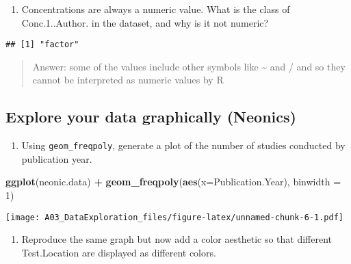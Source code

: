 \documentclass[
]{article}
\newenvironment{Shaded}{\begin{snugshade}}{\end{snugshade}}
\newcommand{\DataTypeTok}[1]{\textcolor[rgb]{0.13,0.29,0.53}{#1}}
\newcommand{\DecValTok}[1]{\textcolor[rgb]{0.00,0.00,0.81}{#1}}
\newcommand{\KeywordTok}[1]{\textcolor[rgb]{0.13,0.29,0.53}{\textbf{#1}}}
\newcommand{\NormalTok}[1]{#1}
\newcommand{\OperatorTok}[1]{\textcolor[rgb]{0.81,0.36,0.00}{\textbf{#1}}}
\newcommand{\StringTok}[1]{\textcolor[rgb]{0.31,0.60,0.02}{#1}}
\providecommand{\tightlist}{%
  \setlength{\itemsep}{0pt}\setlength{\parskip}{0pt}}
\begin{document}
\begin{enumerate}
\def\labelenumi{\arabic{enumi}.}
\setcounter{enumi}{7}
\tightlist
\item
  Concentrations are always a numeric value. What is the class of
  Conc.1..Author. in the dataset, and why is it not numeric?
\end{enumerate}

\begin{Shaded}
\end{Shaded}

\begin{verbatim}
## [1] "factor"
\end{verbatim}

\begin{quote}
Answer: some of the values include other symbols like \textasciitilde{}
and / and so they cannot be interpreted as numeric values by R
\end{quote}

\hypertarget{explore-your-data-graphically-neonics}{%
\subsection{Explore your data graphically
(Neonics)}\label{explore-your-data-graphically-neonics}}

\begin{enumerate}
\def\labelenumi{\arabic{enumi}.}
\setcounter{enumi}{8}
\tightlist
\item
  Using \texttt{geom\_freqpoly}, generate a plot of the number of
  studies conducted by publication year.
\end{enumerate}

\begin{Shaded}
\begin{Highlighting}[]
\KeywordTok{ggplot}\NormalTok{(neonic.data) }\OperatorTok{+}
\StringTok{  }\KeywordTok{geom_freqpoly}\NormalTok{(}\KeywordTok{aes}\NormalTok{(}\DataTypeTok{x=}\NormalTok{Publication.Year), }\DataTypeTok{binwidth =} \DecValTok{1}\NormalTok{)}
\end{Highlighting}
\end{Shaded}

\texttt{[image: A03\_DataExploration\_files/figure-latex/unnamed-chunk-6-1.pdf]}

\begin{enumerate}
\def\labelenumi{\arabic{enumi}.}
\setcounter{enumi}{9}
\tightlist
\item
  Reproduce the same graph but now add a color aesthetic so that
  different Test.Location are displayed as different colors.
\end{enumerate}
\end{document}
